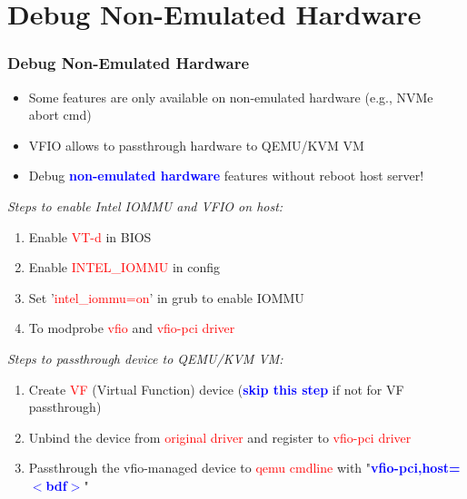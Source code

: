 \documentclass[aspectratio=169]{beamer}
\begin{document}
\section{Debug Non-Emulated Hardware}
\begin{frame}
\frametitle{Debug Non-Emulated Hardware}
\begin{itemize}
\item Some features are only available on non-emulated hardware (e.g., NVMe abort cmd)
\item VFIO allows to passthrough hardware to QEMU/KVM VM
\item Debug \textbf{\textcolor{blue}{non-emulated hardware}} features without reboot host server!
\end{itemize}
\begin{block}{}
\textit{Steps to enable Intel IOMMU and VFIO on host:}
\begin{enumerate}
\item Enable \textcolor{red}{VT-d} in BIOS
\item Enable \textcolor{red}{INTEL\_IOMMU} in config
\item Set '\textcolor{red}{intel\_iommu=on}' in grub to enable IOMMU
\item To modprobe \textcolor{red}{vfio} and \textcolor{red}{vfio-pci driver}
\end{enumerate}

\vspace{2 mm}

\textit{Steps to passthrough device to QEMU/KVM VM:}
\begin{enumerate}
\item Create \textcolor{red}{VF} (Virtual Function) device (\textbf{\textcolor{blue}{skip this step}} if not for VF passthrough)
\item Unbind the device from \textcolor{red}{original driver} and register to \textcolor{red}{vfio-pci driver}
\item Passthrough the vfio-managed device to \textcolor{red}{qemu cmdline} with "\textbf{\textcolor{blue}{vfio-pci,host=$<$bdf$>$}}"
\end{enumerate}
\end{block}
\end{frame}

\end{document}
